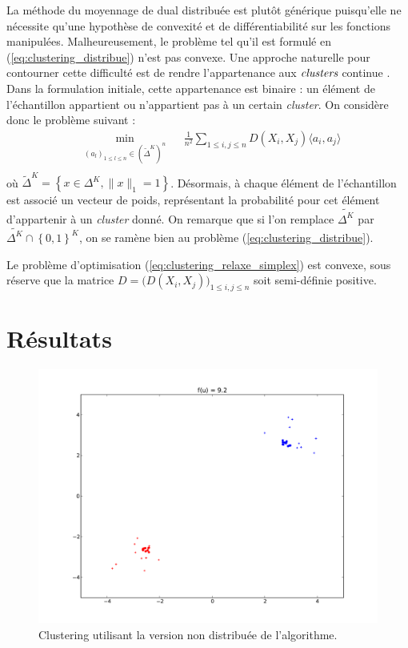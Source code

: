 \documentclass[a4paper]{article}
\begin{document}
La méthode du moyennage de dual distribuée est plutôt générique puisqu'elle
ne nécessite qu'une hypothèse de convexité et de différentiabilité sur les
fonctions manipulées. Malheureusement, le problème tel qu'il est formulé en
(\ref{eq:clustering_distribue}) n'est pas convexe. Une approche naturelle pour
contourner cette difficulté est de rendre l'appartenance aux $\emph{clusters}$
\og continue \fg{}. Dans la formulation initiale, cette appartenance est binaire : un
élément de l'échantillon appartient ou n'appartient pas à un certain
\emph{cluster}. On considère donc le problème suivant :
\begin{equation}
    \label{eq:clustering_relaxe_simplex}
    \begin{aligned}
        & \min_{(a_l)_{1 \leq l \leq n} \in (\tilde{\Delta}^K)^n}
        && \frac{1}{n^2}\sum_{1 \leq i,j \leq n} D(X_i, X_j) \langle a_i, a_j \rangle \\
    \end{aligned}
\end{equation}
où $\tilde{\Delta}^K = \left\{x \in \Delta^K, \|x\|_1 = 1  \right\}$.
Désormais, à chaque élément de l'échantillon est associé un vecteur de poids,
représentant la probabilité pour cet élément d'appartenir à un \emph{cluster}
donné. On remarque que si l'on remplace $\tilde{\Delta^K}$ par
$\tilde{\Delta^K} \cap \left\{ 0, 1 \right\}^K$,
on se ramène bien au problème (\ref{eq:clustering_distribue}).

Le problème d'optimisation (\ref{eq:clustering_relaxe_simplex}) est convexe,
sous réserve que la matrice $D = \big(D(X_i, X_j)\big)_{1 \leq i,j \leq n}$
soit semi-définie positive.





\section{Résultats}
\label{sec:resultats}

\begin{figure}[h]
\begin{center}
    \includegraphics[width=.9\textwidth]{figures/da_w-bin_clust.pdf}
\end{center}
\caption{Clustering utilisant la version non distribuée de l'algorithme.}
\label{fig:da_wbin_clust}
\end{figure}
\end{document}
